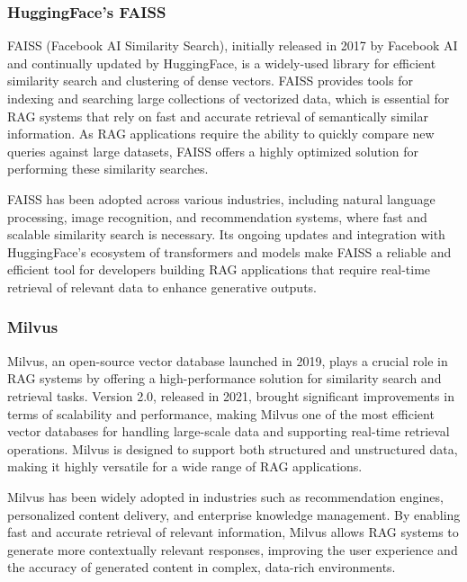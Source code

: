 \subsubsection{HuggingFace's FAISS}

FAISS (Facebook AI Similarity Search), initially released in 2017 by Facebook AI and continually updated by HuggingFace, is a widely-used library for efficient similarity search and clustering of dense vectors. 
FAISS provides tools for indexing and searching large collections of vectorized data, which is essential for RAG systems that rely on fast and accurate retrieval of semantically similar information. 
As RAG applications require the ability to quickly compare new queries against large datasets, FAISS offers a highly optimized solution for performing these similarity searches.

FAISS has been adopted across various industries, including natural language processing, image recognition, and recommendation systems, where fast and scalable similarity search is necessary. 
Its ongoing updates and integration with HuggingFace’s ecosystem of transformers and models make FAISS a reliable and efficient tool for developers building RAG applications that require real-time retrieval of relevant data to enhance generative outputs.

\subsubsection{Milvus}

Milvus, an open-source vector database launched in 2019, plays a crucial role in RAG systems by offering a high-performance solution for similarity search and retrieval tasks. 
Version 2.0, released in 2021, brought significant improvements in terms of scalability and performance, making Milvus one of the most efficient vector databases for handling large-scale data and supporting real-time retrieval operations. 
Milvus is designed to support both structured and unstructured data, making it highly versatile for a wide range of RAG applications.

Milvus has been widely adopted in industries such as recommendation engines, personalized content delivery, and enterprise knowledge management. 
By enabling fast and accurate retrieval of relevant information, Milvus allows RAG systems to generate more contextually relevant responses, improving the user experience and the accuracy of generated content in complex, data-rich environments.

